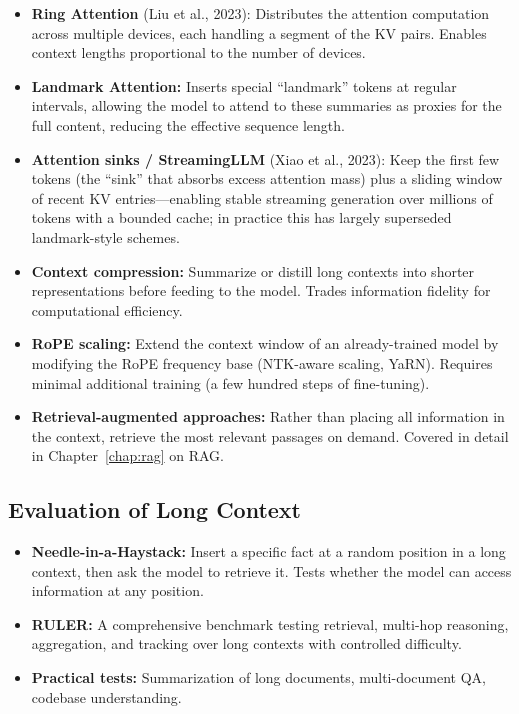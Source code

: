\begin{itemize}[leftmargin=*]
\item \textbf{Ring Attention} (Liu et al., 2023): Distributes the attention
  computation across multiple devices, each handling a segment of the KV
  pairs.  Enables context lengths proportional to the number of devices.

\item \textbf{Landmark Attention:} Inserts special ``landmark'' tokens at
  regular intervals, allowing the model to attend to these summaries as
  proxies for the full content, reducing the effective sequence length.

\item \textbf{Attention sinks / StreamingLLM} (Xiao et al., 2023): Keep the
  first few tokens (the ``sink'' that absorbs excess attention mass) plus a
  sliding window of recent KV entries---enabling stable streaming
  generation over millions of tokens with a bounded cache; in practice this
  has largely superseded landmark-style schemes.

\item \textbf{Context compression:} Summarize or distill long contexts into
  shorter representations before feeding to the model.  Trades information
  fidelity for computational efficiency.

\item \textbf{RoPE scaling:} Extend the context window of an already-trained
  model by modifying the RoPE frequency base (NTK-aware scaling, YaRN).
  Requires minimal additional training (a few hundred steps of fine-tuning).

\item \textbf{Retrieval-augmented approaches:} Rather than placing all
  information in the context, retrieve the most relevant passages on demand.
  Covered in detail in Chapter~\ref{chap:rag} on RAG.
\end{itemize}

\subsection{Evaluation of Long Context}

\begin{itemize}[leftmargin=*]
\item \textbf{Needle-in-a-Haystack:} Insert a specific fact at a random
  position in a long context, then ask the model to retrieve it.  Tests
  whether the model can access information at any position.
\item \textbf{RULER:} A comprehensive benchmark testing retrieval, multi-hop
  reasoning, aggregation, and tracking over long contexts with controlled
  difficulty.
\item \textbf{Practical tests:} Summarization of long documents, multi-document
  QA, codebase understanding.
\end{itemize}

